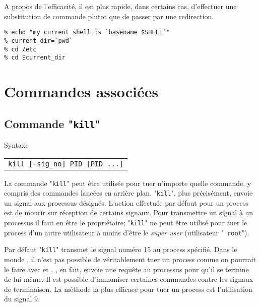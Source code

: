 A propos de l'efficacit{\'e}, il est plus rapide, dans certains cas,
d'effectuer une substitution de commande plutot que de passer par une
redirection.

\begin{example}
\begin{verbatim}
% echo "my current shell is `basename $SHELL`"
% current_dir=`pwd`
% cd /etc
% cd $current_dir
\end{verbatim}
\end{example}

\section{Commandes associ{\'e}es}

\subsection{\label{multi-task-kill}Commande "{\tt kill}"}

\begin{definition}{Syntaxe}
\begin{tabular}{@{\hspace{1cm}}l}
	{\tt kill [-sig\_no] PID [PID ...]}\\[0.2cm]
\end{tabular}
\end{definition}

La commande "\texttt{kill}" peut {\^e}tre
utilis{\'e}e pour tuer n'importe quelle commande, y compris des
commandes lanc{\'e}es en arri{\`e}re plan. "{\tt kill}", plus
pr{\'e}cis{\'e}ment, envoie un signal aux processus d{\'e}sign{\'e}s.
L'action effectu{\'e}e par d{\'e}faut pour un process est de mourir sur
r{\'e}ception de certains signaux. Pour transmettre un signal {\`a} un
processus il faut en {\^e}tre le propri{\'e}taire; "{\tt kill}" ne
peut {\^e}tre utilis{\'e} pour tuer le process d'un autre utilisateur
{\`a} moins d'{\^e}tre le {\sl super user} (utilisateur "{\tt
root}").

Par d{\'e}faut "{\tt kill}" transmet le signal num{\'e}ro 15 au process sp{\'e}cifi{\'e}.
Dans le monde {\Unix}, il n'est pas possible de v{\'e}ritablement tuer un process
comme on pourrait le faire avec {\WindowsNT} et {\OpenVMS}. {\Unix}, en fait,
envoie une requ{\^e}te au processus pour qu'il se termine de lui-m{\^e}me. Il est
possible d'immuniser certaines commandes contre les signaux de terminaison. La
m{\'e}thode la plus efficace pour tuer un process est l'utilisation du signal 9.


